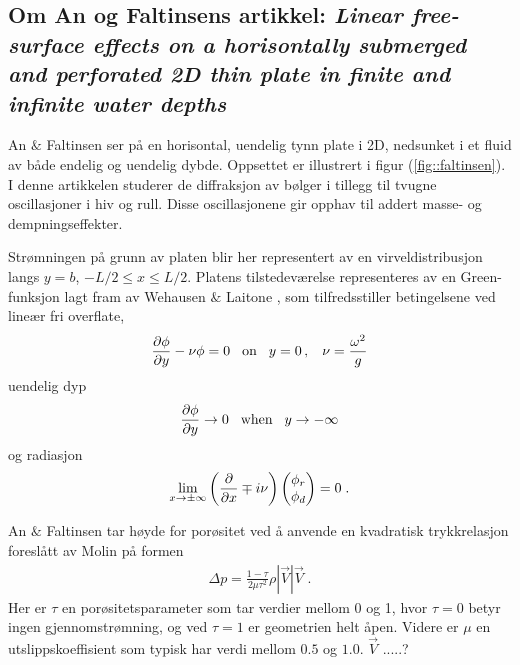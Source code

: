 \documentclass[a4paper,norsk]{article}
\begin{document}
\subsection{Om An og Faltinsens artikkel: \emph{Linear free-surface effects on a horisontally submerged and perforated 2D thin plate in finite and infinite water depths}}

An $\&$ Faltinsen \cite{faltinsen} ser på en horisontal, uendelig tynn plate i 2D,
nedsunket i et fluid av både endelig og uendelig dybde. Oppsettet er illustrert
i figur (\ref{fig::faltinsen}). I denne artikkelen studerer de diffraksjon av
bølger i tillegg til tvugne oscillasjoner i hiv og rull. Disse oscillasjonene
gir opphav til addert masse- og dempningseffekter.

Strømningen på grunn av platen blir her representert av en virveldistribusjon 
langs $y=b$, $-L/2 \leq x \leq L/2$. Platens tilstedeværelse representeres av en
Green-funksjon lagt fram av Wehausen $\&$ Laitone \cite{wehausen}, som
tilfredsstiller betingelsene ved lineær fri overflate, 
\begin{align}
  \frac{\partial \phi}{\partial y} - \nu\phi = 0 \hspace{3mm} \text{on} \hspace{3mm} y = 0 \,,
           \hspace{3mm} \nu=\frac{\omega^2}{g}
\end{align}
uendelig dyp
\begin{align}
  \frac{\partial \phi}{\partial y} \rightarrow 0 \hspace{3mm} \text{when} \hspace{3mm}
                                         y \rightarrow -\infty
\end{align}
og radiasjon
\begin{align}
  \lim_{x\rightarrow\pm\infty} \left( \frac{\partial }{\partial x}\mp i\nu \right)
  \begin{pmatrix}
    \phi_r \\ \phi_d
  \end{pmatrix} = 0 \;.
\end{align}

An $\&$ Faltinsen tar høyde for porøsitet ved å anvende en kvadratisk trykkrelasjon
foreslått av Molin \cite{molin} på formen
\begin{align}
  \Delta p = \frac{1-\tau}{2\mu\tau^2}\rho|\vec{V}|\vec{V} \;.
\end{align}
Her er $\tau$ en porøsitetsparameter som tar verdier mellom 0 og 1, hvor $\tau=0$
betyr ingen gjennomstrømning, og ved $\tau=1$ er geometrien helt åpen. Videre er
$\mu$ en utslippskoeffisient som typisk har verdi mellom $0.5$ og $1.0$.
$\vec{V}$ .....?
\end{document}
